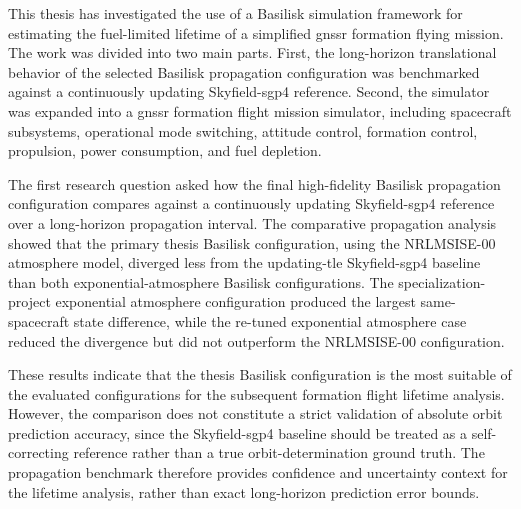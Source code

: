This thesis has investigated the use of a Basilisk simulation framework for estimating the fuel-limited lifetime of a simplified \gls{gnssr} formation flying mission. The work was divided into two main parts. First, the long-horizon translational behavior of the selected Basilisk propagation configuration was benchmarked against a continuously updating Skyfield-\gls{sgp4} reference. Second, the simulator was expanded into a \gls{gnssr} formation flight mission simulator, including spacecraft subsystems, operational mode switching, attitude control, formation control, propulsion, power consumption, and fuel depletion.

The first research question asked how the final high-fidelity Basilisk propagation configuration compares against a continuously updating Skyfield-\gls{sgp4} reference over a long-horizon propagation interval. The comparative propagation analysis showed that the primary thesis Basilisk configuration, using the NRLMSISE-00 atmosphere model, diverged less from the updating-\gls{tle} Skyfield-\gls{sgp4} baseline than both exponential-atmosphere Basilisk configurations. The specialization-project exponential atmosphere configuration produced the largest same-spacecraft state difference, while the re-tuned exponential atmosphere case reduced the divergence but did not outperform the NRLMSISE-00 configuration.

These results indicate that the thesis Basilisk configuration is the most suitable of the evaluated configurations for the subsequent formation flight lifetime analysis. However, the comparison does not constitute a strict validation of absolute orbit prediction accuracy, since the Skyfield-\gls{sgp4} baseline should be treated as a self-correcting reference rather than a true orbit-determination ground truth. The propagation benchmark therefore provides confidence and uncertainty context for the lifetime analysis, rather than exact long-horizon prediction error bounds.

